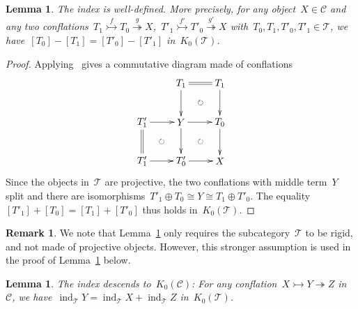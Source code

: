 \documentclass{amsart}
\newtheorem{lemma}[theorem]{Lemma}
\theoremstyle{definition}
\newtheorem{remark}[theorem]{Remark}
\newcommand{\cat}{\mathcal{C}}
\newcommand{\ind}{\operatorname{ind}}
\newcommand{\tc}{\mathcal{T}}
\newcommand{\infl}{\rightarrowtail}
\newcommand{\defl}{\twoheadrightarrow}
\newcommand{\kzero}[1]{K_0(#1)}
\begin{document}
\begin{lemma}
\label{lemma::index well-defined extricat}
 The index is well-defined. More precisely, for any object~$X\in\cat$ and any two conflations~$T_1\overset{f}{\infl} T_0 \overset{g}{\defl} X$,~$T'_1\overset{f'}{\infl} T'_0 \overset{g'}{\defl} X$ with~$T_0,T_1,T'_0,T'_1\in\tc$, we have~$[T_0]-[T_1]=[T'_0]-[T'_1]$ in~$\kzero{\tc}$.
\end{lemma}

\begin{proof}
Applying~\cite[Proposition 3.15]{NakaokaPalu} gives a commutative diagram made of conflations
\[
\xy
%
(-7,21)*+{T_1}="-12";
(7,21)*+{T_1}="-14";
%
(-21,7)*+{T'_1}="0";
(-7,7)*+{Y}="2";
(7,7)*+{T_0}="4";
%
(-21,-7)*+{T'_1}="10";
(-7,-7)*+{T'_0}="12";
(7,-7)*+{X}="14";
%
{\ar@{=} "-12";"-14"};
%
{\ar "-12";"2"};
{\ar "-14";"4"};
%
{\ar "0";"2"};
{\ar "2";"4"};
%
{\ar@{=} "0";"10"};
{\ar "2";"12"};
{\ar "4";"14"};
%
{\ar "10";"12"};
{\ar "12";"14"};
%
{\ar@{}|\circlearrowright "-12";"4"};
{\ar@{}|\circlearrowright "0";"12"};
{\ar@{}|\circlearrowright "2";"14"};
\endxy
\]
Since the objects in~$\tc$ are projective, the two conflations with middle term~$Y$ split and there are isomorphisms~$T'_1\oplus T_0 \cong Y \cong T_1\oplus T'_0$.
The equality~$[T'_1]+[T_0]=[T_1]+[T'_0]$ thus holds in~$\kzero{\tc}$.
\end{proof}

\begin{remark}
We note that Lemma~\ref{lemma::index well-defined extricat} only requires the subcategory~$\tc$ to be rigid, and not made of projective objects.
However, this stronger assumption is used in the proof of Lemma~\ref{lemma::index kzero extricat} below.
\end{remark}

\begin{lemma}
\label{lemma::index kzero extricat}
 The index descends to~$\kzero{\cat}$: For any conflation~$X\infl Y\defl Z$ in~$\cat$, we have~$\ind_\tc Y = \ind_\tc X + \ind_\tc Z$ in~$\kzero{\tc}$.
\end{lemma}
\end{document}
